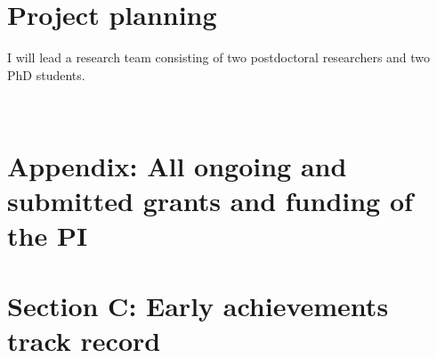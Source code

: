 \documentclass[11pt,a4paper]{article}
\begin{document}
\section{Project planning}
\smallskip

I will lead a research team consisting of two postdoctoral researchers and two PhD students. 





\clearpage



~ 


\clearpage

%

\clearpage

\section*{Appendix: All ongoing and submitted grants and funding of the PI}

%

\clearpage

\section*{Section C: Early achievements track record}

%
\end{document}
